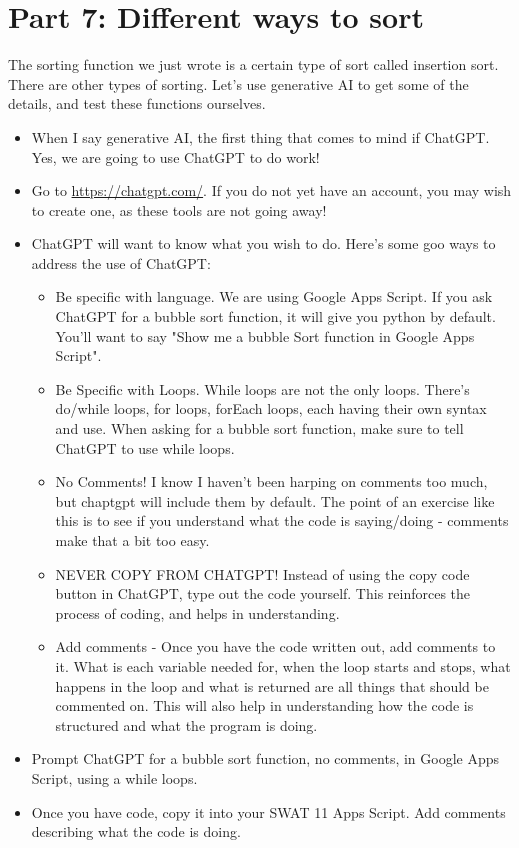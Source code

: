 \documentclass{article}
\begin{document}
\section*{Part 7: Different ways to sort}
The sorting function we just wrote is a certain type of sort called insertion sort.  There are other types of sorting. Let's use generative AI to get some of the details, and test these functions ourselves.
\begin{itemize}
	\item When I say generative AI, the first thing that comes to mind if ChatGPT. Yes, we are going to use ChatGPT to do work!
	\item Go to \url{https://chatgpt.com/}.  If you do not yet have an account, you may wish to create one, as these tools are not going away!
	\item ChatGPT will want to know what you wish to do.  Here's some goo ways to address the use of ChatGPT:
	\begin{itemize}
		\item Be specific with language.  We are using Google Apps Script.  If you ask ChatGPT for a bubble sort function, it will give you python by default.  You'll want to say "Show me a bubble Sort function in Google Apps Script".
		\item Be Specific with Loops.  While loops are not the only loops.  There's do/while loops, for loops, forEach loops, each having their own syntax and use.  When asking for a bubble sort function, make sure to tell ChatGPT to use while loops.
		\item No Comments!  I know I haven't been harping on comments too much, but chaptgpt will include them by default.  The point of an exercise like this is to see if you understand what the code is saying/doing - comments make that a bit too easy.  
		\item NEVER COPY FROM CHATGPT!  Instead of using the copy code button in ChatGPT, type out the code yourself.  This reinforces the process of coding, and helps in understanding.
		\item Add comments - Once you have the code written out, add comments to it.  What is each variable needed for, when the loop starts and stops, what happens in the loop and what is returned are all things that should be commented on.  This will also help in understanding how the code is structured and what the program is doing.
	\end{itemize}
	\item Prompt ChatGPT for a bubble sort function, no comments, in Google Apps Script, using a while loops.
	\item Once you have code, copy it into your SWAT 11 Apps Script.  Add comments describing what the code is doing.
\end{itemize}
\end{document}
